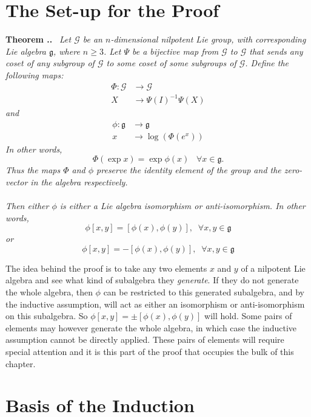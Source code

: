 \documentclass[honours]{UNSWthesis}
\newcommand{\G}{\mathcal{G}}
\newcommand{\g}{\mathfrak{g}}
\newcommand{\1}{\mathbf{e}_{1}}
\newcommand{\2}{\mathbf{e}_{3}}
\newcommand{\3}{\mathbf{e}_{3}}
\newcounter{Item}[section]
\newenvironment{Theorem}{\medskip
                            \refstepcounter{Item}
                            \noindent
                           {\bf Theorem \thesection.\theItem.}\ %
                            \begingroup \sl}
                           {\endgroup\medskip}
\begin{document}
\section{The Set-up for the Proof}
\begin{Theorem}\label{BigTheorem}
Let $\G$ be an $n$-dimensional nilpotent Lie group, with corresponding Lie algebra $\g$, where $n \geq 3$. Let $\Psi$ be a bijective map from $\G$ to $\G$ that sends any coset of any subgroup of $\G$ to some coset of some subgroups of $\G$.  Define the following maps: 
\begin{align*}
\Phi: \G &\longrightarrow \G \\
X & \longrightarrow \Psi(I)^{-1} \Psi(X)
\end{align*}
and 
\begin{align*}
\phi: \g &\longrightarrow \g \\
x & \longrightarrow \log(\Phi(e^{x}))
\end{align*}
In other words, 
\[
\Phi(\exp{x})=\exp{\phi(x)} \;\;\; \forall x \in \g.
\]
Thus the maps $\Phi$ and $\phi$ preserve the identity element of the group and the zero-vector in the algebra respectively. \\
\\ Then either $\phi$ is either a Lie algebra isomorphism or anti-isomorphism. In other words, 
\[
\phi[x,y]= [\phi(x),\phi(y)], \;\;\forall x,y \in \g
\]
or
\[
\phi[x,y]= -[\phi(x),\phi(y)], \;\;\forall x,y \in \g
\]
\end{Theorem}

The idea behind the proof is to take any two elements $x$ and $y$ of a nilpotent Lie algebra and see what kind of subalgebra they \emph{generate}. 
If they do not generate the whole algebra, then $\phi$ can be restricted to this generated subalgebra, and by the inductive assumption, will act as either an isomorphism or anti-isomorphism on this subalgebra. So $\phi[x,y]=\pm[\phi(x),\phi(y)]$ will hold. Some pairs of elements may however generate the whole algebra, in which case the inductive assumption cannot be directly applied. These pairs of elements will require special attention and it is this part of the proof that occupies the bulk of this chapter. 

\section{Basis of the Induction}
\end{document}
